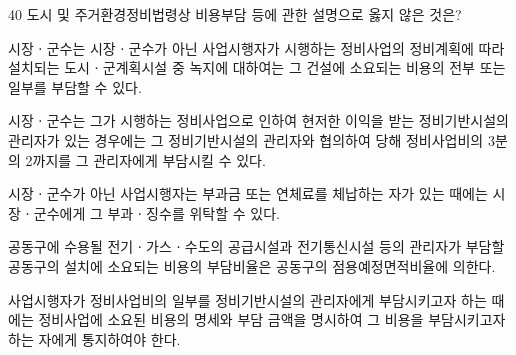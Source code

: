 \begin{question}{40}
도시 및 주거환경정비법령상 비용부담 등에 관한 설명으로 옳지 않은 것은?
\begin{choices}
  \item 시장ㆍ군수는 시장ㆍ군수가 아닌 사업시행자가 시행하는 정비사업의 정비계획에 따라 설치되는 도시ㆍ군계획시설 중 녹지에 대하여는 그 건설에 소요되는 비용의 전부 또는 일부를 부담할 수 있다.
  \item 시장ㆍ군수는 그가 시행하는 정비사업으로 인하여 현저한 이익을 받는 정비기반시설의 관리자가 있는 경우에는 그 정비기반시설의 관리자와 협의하여 당해 정비사업비의 3분의 2까지를 그 관리자에게 부담시킬 수 있다.
  \item 시장ㆍ군수가 아닌 사업시행자는 부과금 또는 연체료를 체납하는 자가 있는 때에는 시장ㆍ군수에게 그 부과ㆍ징수를 위탁할 수 있다.
  \item 공동구에 수용될 전기ㆍ가스ㆍ수도의 공급시설과 전기통신시설 등의 관리자가 부담할 공동구의 설치에 소요되는 비용의 부담비율은 공동구의 점용예정면적비율에 의한다.
  \item 사업시행자가 정비사업비의 일부를 정비기반시설의 관리자에게 부담시키고자 하는 때에는 정비사업에 소요된 비용의 명세와 부담 금액을 명시하여 그 비용을 부담시키고자 하는 자에게 통지하여야 한다.
\end{choices}
\end{question}
